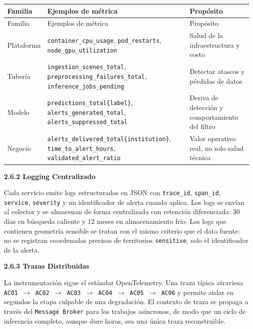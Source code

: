 \documentclass{article}
\newcommand{\mdhfour}[1]{\par\medskip\noindent\textbf{#1}\par\nobreak\smallskip}
\begin{document}
{\small
\begin{longtable}{@{}L{0.75in}L{3.28in}L{2.05in}@{}}
\toprule
Familia & Ejemplos de métrica & Propósito \\
\midrule
\endfirsthead
\toprule
Familia & Ejemplos de métrica & Propósito \\
\midrule
\endhead
\bottomrule
\endlastfoot
Plataforma & \texttt{container\_\allowbreak{}cpu\_\allowbreak{}usage}, \texttt{pod\_\allowbreak{}restarts}, \texttt{node\_\allowbreak{}gpu\_\allowbreak{}utilization} & Salud de la infraestructura y costo \\
Tubería & \texttt{ingestion\_\allowbreak{}scenes\_\allowbreak{}total}, \texttt{preprocessing\_\allowbreak{}failures\_\allowbreak{}total}, \texttt{inference\_\allowbreak{}jobs\_\allowbreak{}pending} & Detectar atascos y pérdidas de datos \\
Modelo & \texttt{predictions\_\allowbreak{}total\{label\}}, \texttt{alerts\_\allowbreak{}generated\_\allowbreak{}total}, \texttt{alerts\_\allowbreak{}suppressed\_\allowbreak{}total} & Deriva de detección y comportamiento del filtro \\
Negocio & \texttt{alerts\_\allowbreak{}delivered\_\allowbreak{}total\{institution\}}, \texttt{time\_\allowbreak{}to\_\allowbreak{}alert\_\allowbreak{}hours}, \texttt{validated\_\allowbreak{}alert\_\allowbreak{}ratio} & Valor operativo real, no solo salud técnica \\
\end{longtable}
}

\mdhfour{2.6.2 Logging Centralizado}

Cada servicio emite logs estructurados en JSON con \texttt{trace\_\allowbreak{}id}, \texttt{span\_\allowbreak{}id}, \texttt{service}, \texttt{severity} y un identificador de alerta cuando aplica. Los logs se envían al colector y se almacenan de forma centralizada con retención diferenciada: 30 días en búsqueda caliente y 12 meses en almacenamiento frío. Los logs que contienen geometría sensible se tratan con el mismo criterio que el dato fuente: no se registran coordenadas precisas de territorios \texttt{sensitive}, solo el identificador de la alerta.

\mdhfour{2.6.3 Trazas Distribuidas}

La instrumentación sigue el estándar OpenTelemetry. Una traza típica atraviesa \texttt{AC01 \ensuremath{\rightarrow} AC02 \ensuremath{\rightarrow} AC03 \ensuremath{\rightarrow} AC04 \ensuremath{\rightarrow} AC05 \ensuremath{\rightarrow} AC06} y permite aislar en segundos la etapa culpable de una degradación. El contexto de traza se propaga a través del \texttt{Message Broker} para los trabajos asíncronos, de modo que un ciclo de inferencia completo, aunque dure horas, sea una única traza reconstruible.
\end{document}
